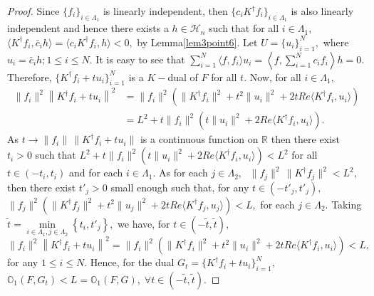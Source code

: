 \documentclass[final,1p,times]{elsarticle}
\begin{document}
\begin{proof}
	Since $\{f_i\}_{i \in \Lambda_1}$ is linearly independent, then $\{c_i K^\dag f_i\}_{i \in \Lambda_1}$ is also linearly independent and hence there exists a $h \in \mathcal{H}_n$ such that for all $i \in \Lambda_1,$ $\langle K^\dag f_i, \bar{c}_i h \rangle = \langle c_i K^\dag f_i, h \rangle < 0,$ by Lemma\ref{lem3point6}. Let $U=\{u_i\}_{i=1}^N,$ where $u_i = \bar{c}_i h;1 \leq i \leq N. $ It is easy to see that $\sum\limits_{i=1}^N \langle f, f_i \rangle u_i = \left \langle f, \sum\limits_{i=1}^N c_i f_i \right \rangle h = 0.$ Therefore, $\{K^\dag f_i + tu_i\}_{i=1}^N$ is a $K-$dual of $F$ for all $t.$ Now, for all $i \in \Lambda_1,$
	\begin{align*}
		\|f_i\|^2\left\|K^\dag f_i +tu_i \right\|^2  &=  \|f_i\|^2 \left( \|K^\dag f_i\|^2 + t^2\|u_i\|^2 + 2t Re\langle K^\dag f_i,u_i\rangle \right) \\&= L^2 +  t \|f_i\|^2 \left(  t\|u_i\|^2 + 2 Re\langle K^\dag f_i,u_i\rangle\right).
	\end{align*}
 As $t \to \|f_i\|\,\|K^\dag f_i + tu_i\|$ is a  continuous  function on $\mathbb{R}$ then there exist $t_i >0 $ such that  $ L^2 +  t \|f_i\|^2 \left(  t\|u_i\|^2 + 2 Re\langle K^\dag f_i,u_i\rangle\right) < L^2$ for all $t \in (-t_i, t_i)$ and for each $i \in \Lambda_1.$ As for each $j \in \Lambda_2,\;$ $\|f_j\|^2\,\|K^\dag f_j \|^2 <L^2,$ then there exist $t'_j>0$ small enough such that, for any $t \in (-t'_j, t'_j),\;$  $\|f_j\|^2 \left( \|K^\dag f_j\|^2 + t^2\|u_j\|^2 + 2t Re\langle K^\dag f_j,u_j\rangle \right) < L,$ for each $j \in \Lambda_2.$ Taking $\widetilde{t} = \min\limits_{i \in \Lambda_1, j \in \Lambda_2} \left\{t_i, t'_j\right\},$ we have, for $t \in (-\widetilde{t}, \widetilde{t} ),\;$ $\|f_i\|^2\left\|K^\dag f_i +tu_i \right\|^2  =  \|f_i\|^2 \left( \|K^\dag f_i\|^2 + t^2\|u_i\|^2 + 2t Re\langle K^\dag f_i,u_i\rangle \right) < L,$ for any $1 \leq i \leq N.$ Hence, for the dual $G_t = \{K^\dag f_i + tu_i\}_{i=1}^N ,$\; $\mathbb{O}_{1}(F,G_t) <L = \mathbb{O}_{1}(F,G),\;\forall t \in  (-\widetilde{t}, \widetilde{t} ).$

\end{proof}
\end{document}
